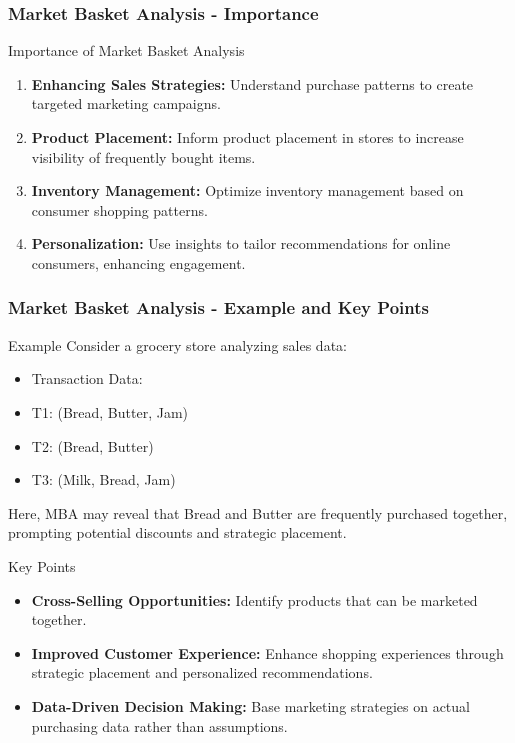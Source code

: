 \documentclass[aspectratio=169]{beamer}
\begin{document}
\begin{frame}[fragile]
    \frametitle{Market Basket Analysis - Importance}
    \begin{block}{Importance of Market Basket Analysis}
        \begin{enumerate}
            \item \textbf{Enhancing Sales Strategies:} Understand purchase patterns to create targeted marketing campaigns.
            \item \textbf{Product Placement:} Inform product placement in stores to increase visibility of frequently bought items.
            \item \textbf{Inventory Management:} Optimize inventory management based on consumer shopping patterns.
            \item \textbf{Personalization:} Use insights to tailor recommendations for online consumers, enhancing engagement.
        \end{enumerate}
    \end{block}
\end{frame}

\begin{frame}[fragile]
    \frametitle{Market Basket Analysis - Example and Key Points}
    \begin{block}{Example}
        Consider a grocery store analyzing sales data:
        \begin{itemize}
            \item Transaction Data:
            \item T1: (Bread, Butter, Jam)
            \item T2: (Bread, Butter)
            \item T3: (Milk, Bread, Jam)
        \end{itemize}
        Here, MBA may reveal that Bread and Butter are frequently purchased together, prompting potential discounts and strategic placement.
    \end{block}

    \begin{block}{Key Points}
        \begin{itemize}
            \item \textbf{Cross-Selling Opportunities:} Identify products that can be marketed together.
            \item \textbf{Improved Customer Experience:} Enhance shopping experiences through strategic placement and personalized recommendations.
            \item \textbf{Data-Driven Decision Making:} Base marketing strategies on actual purchasing data rather than assumptions.
        \end{itemize}
    \end{block}
\end{frame}
\end{document}
